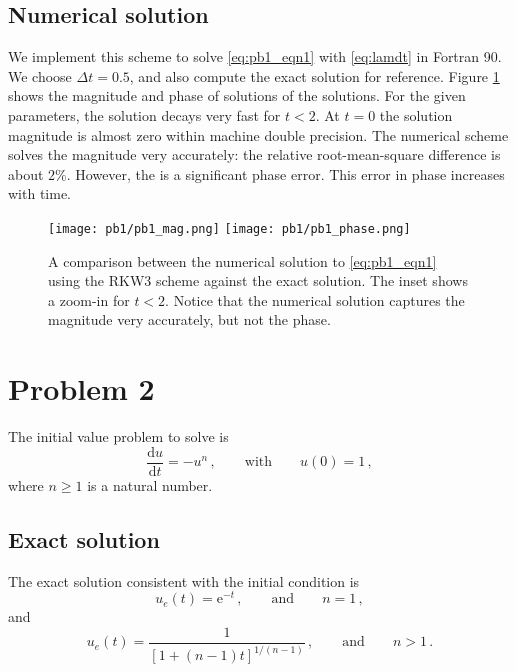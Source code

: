 \documentclass[11pt]{article}
\newcommand{\dd}{\mathrm{d}}
\newcommand{\ee}{\mathrm{e}}
\newcommand{\dt}{\Delta t}
\newcommand{\com}{\, ,}
\newcommand{\per}{\, .}
\newcommand{\qqand}{\qquad \text{and} \qquad}
\def\beq{\begin{equation}}
\def\eeq{\end{equation}}
\begin{document}
\subsection*{Numerical solution}
We implement this scheme to solve \eqref{eq:pb1_eqn1} with \eqref{eq:lamdt} in Fortran 90. We choose $\dt = 0.5$, and also compute the exact solution for reference. Figure \ref{fig:pb1} shows the magnitude and phase of solutions  of the solutions. For the given parameters, the solution decays very fast for $t<2$. At $t=0$ the solution magnitude is almost zero within machine double precision. The numerical scheme solves the magnitude very accurately: the relative root-mean-square difference is about $2\%$. However, the is a significant phase error. This error in phase increases with time. 

\begin{figure}[ht]
\begin{center}
\texttt{[image: pb1/pb1\_mag.png]}
\texttt{[image: pb1/pb1\_phase.png]}
\end{center}
\caption{A comparison between the numerical solution to \eqref{eq:pb1_eqn1} using the RKW3 scheme against the exact solution. The inset shows a zoom-in for $t<2$. Notice that the numerical solution captures the magnitude very accurately, but not the phase.}
\label{fig:pb1}
\end{figure}

\section*{Problem 2}
The initial value problem to solve is
\beq
\label{eq:pb2_eqn}
\frac{\dd u}{\dd t} = - u^n\com \qquad \text{with} \qquad u(0) =1\com
\eeq
where $n\ge1$ is a natural number.

\subsection*{Exact solution}
The exact solution consistent with the initial condition is
\beq
u_{e}(t) = \ee^{-t}\com\qqand n=1\com
\eeq
and
\beq
u_e(t) = \frac{1}{[1 +(n-1)t]^{1/(n-1)}}\com\qqand n>1 \per
\eeq
\end{document}
